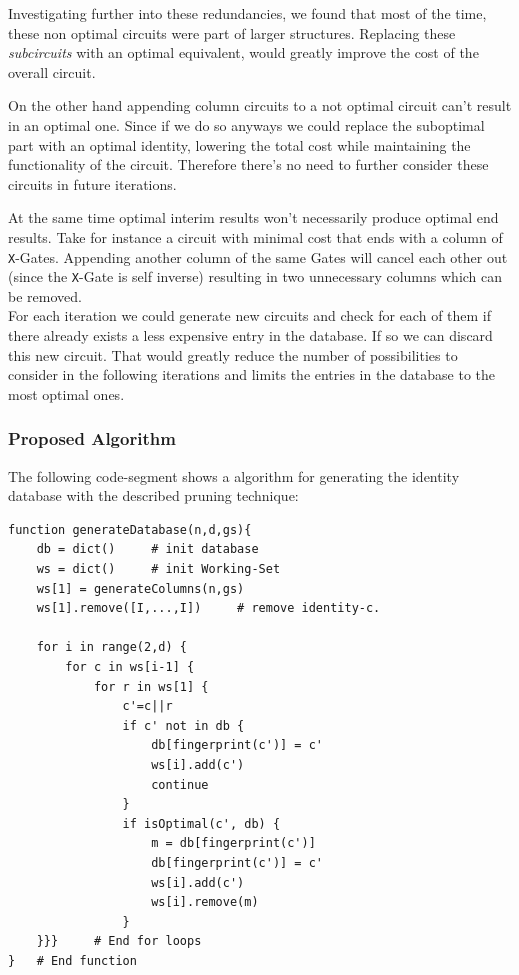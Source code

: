 Investigating further into these redundancies, we found that most of the time, these non optimal circuits were part of larger structures. Replacing these \textit{subcircuits} with an optimal equivalent, would greatly improve the cost of the overall circuit. 

On the other hand appending column circuits to a not optimal circuit can't result in an optimal one. Since if we do so anyways we could replace the suboptimal part with an optimal identity, lowering the total cost while maintaining the functionality of the circuit. Therefore there's no need to further consider these circuits in future iterations.

At the same time optimal interim results won't necessarily produce optimal end results. Take for instance a circuit with minimal cost that ends with a column of \texttt{X}-Gates. Appending another column of the same Gates will cancel each other out (since the \texttt{X}-Gate is self inverse) resulting in two unnecessary columns which can be removed.\\

For each iteration we could generate new circuits and check for each of them if there already exists a less expensive entry in the database. If so we can discard this new circuit. That would greatly reduce the number of possibilities to consider in the following iterations and limits the entries in the database to the most optimal ones.

\subsubsection{Proposed Algorithm}

The following code-segment shows a algorithm for generating the identity database with the described pruning technique:

\begin{verbatim}
function generateDatabase(n,d,gs){
	db = dict() 	# init database
	ws = dict() 	# init Working-Set
	ws[1] = generateColumns(n,gs)
	ws[1].remove([I,...,I]) 	# remove identity-c.
	
	for i in range(2,d) {
		for c in ws[i-1] {
			for r in ws[1] {
				c'=c||r
				if c' not in db {
					db[fingerprint(c')] = c'
					ws[i].add(c')
					continue
				}
				if isOptimal(c', db) {
					m = db[fingerprint(c')]
					db[fingerprint(c')] = c'	
					ws[i].add(c')
					ws[i].remove(m)
				}
	}}} 	# End for loops
} 	# End function
\end{verbatim}

